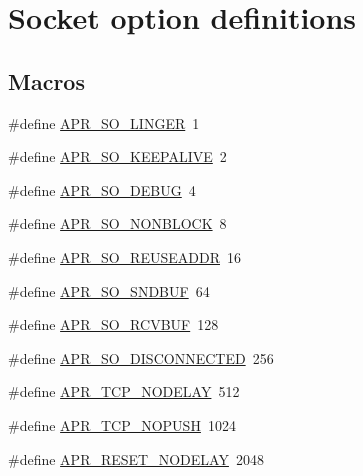 \hypertarget{group__apr__sockopt}{}\section{Socket option definitions}
\label{group__apr__sockopt}
\subsection*{Macros}
\begin{DoxyCompactItemize}
\item 
\#define \mbox{\hyperlink{group__apr__sockopt_ga6a807e7b78937ab74a4fcd6e99d76669}{A\+P\+R\+\_\+\+S\+O\+\_\+\+L\+I\+N\+G\+ER}}~1
\item 
\#define \mbox{\hyperlink{group__apr__sockopt_ga0c54c5b98593d9ad2f8cc8836da7eae5}{A\+P\+R\+\_\+\+S\+O\+\_\+\+K\+E\+E\+P\+A\+L\+I\+VE}}~2
\item 
\#define \mbox{\hyperlink{group__apr__sockopt_ga2b30d26f69059692e97a59ec1d6db73b}{A\+P\+R\+\_\+\+S\+O\+\_\+\+D\+E\+B\+UG}}~4
\item 
\#define \mbox{\hyperlink{group__apr__sockopt_gac3bf19cc28b43da9b9dc396c84914a0f}{A\+P\+R\+\_\+\+S\+O\+\_\+\+N\+O\+N\+B\+L\+O\+CK}}~8
\item 
\#define \mbox{\hyperlink{group__apr__sockopt_ga90434074950efa1383d7c5649026a159}{A\+P\+R\+\_\+\+S\+O\+\_\+\+R\+E\+U\+S\+E\+A\+D\+DR}}~16
\item 
\#define \mbox{\hyperlink{group__apr__sockopt_ga0e7ef8d3785eec5210ede9fd309db35f}{A\+P\+R\+\_\+\+S\+O\+\_\+\+S\+N\+D\+B\+UF}}~64
\item 
\#define \mbox{\hyperlink{group__apr__sockopt_ga4ab9494893075c8db6ac26a997f41f0e}{A\+P\+R\+\_\+\+S\+O\+\_\+\+R\+C\+V\+B\+UF}}~128
\item 
\#define \mbox{\hyperlink{group__apr__sockopt_ga5fd72839e254ddec03ffb624c21fa564}{A\+P\+R\+\_\+\+S\+O\+\_\+\+D\+I\+S\+C\+O\+N\+N\+E\+C\+T\+ED}}~256
\item 
\#define \mbox{\hyperlink{group__apr__sockopt_ga24db924d850dea792e92be7f8bc45cbd}{A\+P\+R\+\_\+\+T\+C\+P\+\_\+\+N\+O\+D\+E\+L\+AY}}~512
\item 
\#define \mbox{\hyperlink{group__apr__sockopt_ga7679a9e3114815eb6c31d26db707975d}{A\+P\+R\+\_\+\+T\+C\+P\+\_\+\+N\+O\+P\+U\+SH}}~1024
\item 
\#define \mbox{\hyperlink{group__apr__sockopt_gac9ee12e841eefaf86fabaae4a298adea}{A\+P\+R\+\_\+\+R\+E\+S\+E\+T\+\_\+\+N\+O\+D\+E\+L\+AY}}~2048
\item 

\end{DoxyCompactItemize}
